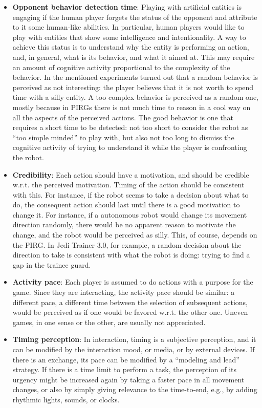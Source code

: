 \begin{itemize}
\item \textbf{Opponent behavior detection time}: Playing with artificial entities is engaging if the human player forgets the status of the opponent and attribute to it some human-like abilities. In particular, human players would like to play with entities that show some intelligence and intentionality. A way to achieve this status is to understand why the entity is performing an action, and, in general, what is its behavior, and what it aimed at. This may require an amount of cognitive activity proportional to the complexity of the behavior. In the mentioned experiments turned out that a random behavior is perceived as not interesting: the player believes that it is not worth to spend time with a silly entity. A too complex behavior is perceived as a random one, mostly because in PIRGs there is not much time to reason in a cool way on all the aspects of the perceived actions. The good behavior is one that requires a short time to be detected: not too short to consider the robot as ``too simple minded'' to play with, but also not too long to dismiss the cognitive activity of trying to understand it while the player is confronting the robot.

\item \textbf{Credibility}: Each action should have a motivation, and should be credible w.r.t. the perceived motivation. Timing of the action should be consistent with this. For instance, if the robot seems to take a decision about what to do, the consequent action should last until there is a good motivation to change it. For instance, if a autonomous robot would change its movement direction randomly, there would be no apparent reason to motivate the change, and the robot would be perceived as silly. This, of course, depends on the PIRG. In Jedi Trainer 3.0, for example, a random decision about the direction to take is consistent with what the robot is doing: trying to find a gap in the trainee guard.

\item \textbf{Activity pace}: Each player is assumed to do actions with a purpose for the game. Since they are interacting, the activity pace should be similar: a different pace, a different time between the selection of subsequent actions, would be perceived as if one would be favored w.r.t. the other one. Uneven games, in one sense or the other, are usually not appreciated.

\item \textbf{Timing perception}: In interaction, timing is a subjective perception, and it can be modified by the interaction mood, or media, or by external devices. If there is an exchange, its pace can be modified by a ``modeling and lead'' strategy. If there is a time limit to perform a task, the perception of its urgency might be increased again by taking a faster pace in all movement changes, or also by simply giving relevance to the time-to-end, e.g., by adding rhythmic lights, sounds, or clocks.
\end{itemize}

